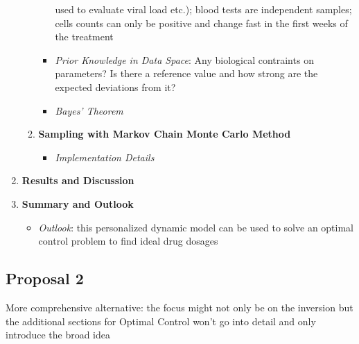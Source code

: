 \begin{enumerate}[font=\bfseries]
\begin{enumerate}[font=\bfseries]
\begin{itemize}[font=\small]
            used to evaluate viral load etc.); blood tests are independent samples; cells counts can only be positive and change fast in the 
            first weeks of the treatment
            \item \textit{Prior Knowledge in Data Space}: Any biological contraints on parameters? Is there a reference value and how strong
            are the expected deviations from it?
            \item \textit{Bayes' Theorem}
        \end{itemize}
        \item \textbf{Sampling with Markov Chain Monte Carlo Method}
        \begin{itemize}[font=\small]
            \item \textit{Implementation Details}
        \end{itemize}
    \end{enumerate}
    \item \textbf{Results and Discussion}
    \item \textbf{Summary and Outlook}
    \begin{itemize}[font=\small]
        \item \textit{Outlook}: this personalized dynamic model can be used to solve an optimal control problem to find ideal drug dosages
    \end{itemize}
\end{enumerate}

\subsection*{Proposal 2}
More comprehensive alternative: the focus might not only be on the inversion but the additional sections for Optimal Control won't 
go into detail and only introduce the broad idea


